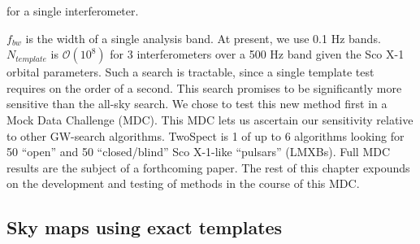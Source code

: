 \noindent for a single interferometer. 

$f_{bw}$ is the width of a single analysis band. 
At present, we use 0.1 Hz bands.
$N_{template}$ is $\mathcal{O}(10^{8})$ for 3 interferometers over a 500 Hz band given the Sco X-1 orbital parameters.
Such a search is tractable, since a single template test requires on the order of a second.
This search promises to be significantly more sensitive than the all-sky search.
We chose to test this new method first in a Mock Data Challenge (MDC).
This MDC lets us ascertain our sensitivity relative to other GW-search algorithms.
TwoSpect is 1 of up to 6 algorithms looking for 50 ``open'' and 50 ``closed/blind'' Sco X-1-like ``pulsars'' (LMXBs).
Full MDC results are the subject of a forthcoming paper.
The rest of this chapter expounds on the development and testing of methods in the course of this MDC.


\subsection{Sky maps using exact templates}

